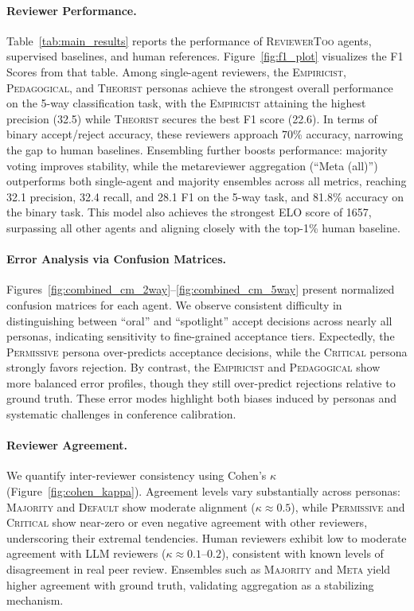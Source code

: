 \documentclass{article} %
\newcommand{\shrink}[1][0.5]{\vspace{-#1\baselineskip}}
\begin{document}
\paragraph{Reviewer Performance.}\shrink[0.75]
Table~\ref{tab:main_results} reports the performance of \textsc{ReviewerToo} agents, supervised baselines, and human references.
Figure~\ref{fig:f1_plot} visualizes the F1 Scores from that table.
Among single-agent reviewers, the \textsc{Empiricist}, \textsc{Pedagogical}, and \textsc{Theorist} personas achieve the strongest overall performance on the 5-way classification task, with the \textsc{Empiricist} attaining the highest precision (32.5) while \textsc{Theorist} secures the best F1 score (22.6). In terms of binary accept/reject accuracy, these reviewers approach 70\% accuracy, narrowing the gap to human baselines.  
Ensembling further boosts performance: majority voting improves stability, while the metareviewer aggregation (``Meta (all)'') outperforms both single-agent and majority ensembles across all metrics, reaching 32.1 precision, 32.4 recall, and 28.1 F1 on the 5-way task, and 81.8\% accuracy on the binary task. This model also achieves the strongest ELO score of 1657, surpassing all other agents and aligning closely with the top-1\% human baseline.

\paragraph{Error Analysis via Confusion Matrices.}\shrink[0.75]
Figures~\ref{fig:combined_cm_2way}--\ref{fig:combined_cm_5way} present normalized confusion matrices for each agent. We observe consistent difficulty in distinguishing between ``oral'' and ``spotlight'' accept decisions across nearly all personas, indicating sensitivity to fine-grained acceptance tiers. Expectedly, the \textsc{Permissive} persona over-predicts acceptance decisions, while the \textsc{Critical} persona strongly favors rejection. By contrast, the \textsc{Empiricist} and \textsc{Pedagogical} show more balanced error profiles, though they still over-predict rejections relative to ground truth. These error modes highlight both biases induced by personas and systematic challenges in conference calibration.

\paragraph{Reviewer Agreement.}\shrink[0.75]
We quantify inter-reviewer consistency using Cohen’s $\kappa$ (Figure~\ref{fig:cohen_kappa}). Agreement levels vary substantially across personas: \textsc{Majority} and \textsc{Default} show moderate alignment ($\kappa \approx 0.5$), while \textsc{Permissive} and \textsc{Critical} show near-zero or even negative agreement with other reviewers, underscoring their extremal tendencies. Human reviewers exhibit low to moderate agreement with LLM reviewers ($\kappa \approx 0.1$--$0.2$), consistent with known levels of disagreement in real peer review. Ensembles such as \textsc{Majority} and \textsc{Meta} yield higher agreement with ground truth, validating aggregation as a stabilizing mechanism.
\end{document}
